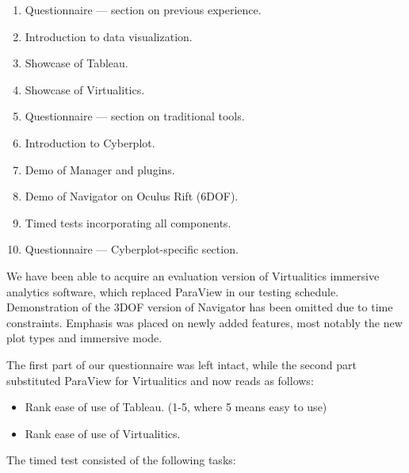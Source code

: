 \documentclass[thesis=M,english,hidelinks]{FITthesisXE}[2012/06/26]
\begin{document}
\begin{enumerate}
\item Questionnaire --- section on previous experience.
\item Introduction to data visualization.
\item Showcase of Tableau.
\item Showcase of Virtualitics.
\item Questionnaire --- section on traditional tools.
\item Introduction to Cyberplot.
\item Demo of Manager and plugins.
\item Demo of Navigator on Oculus Rift (6DOF).
\item Timed tests incorporating all components.
\item Questionnaire --- Cyberplot-specific section.
\end{enumerate}

We have been able to acquire an evaluation version of Virtualitics immersive analytics software, which replaced ParaView in our testing schedule. Demonstration of the 3DOF version of Navigator has been omitted due to time constraints. Emphasis was placed on newly added features, most notably the new plot types and immersive mode.

The first part of our questionnaire was left intact, while the second part substituted ParaView for Virtualitics and now reads as follows:

\begin{itemize}
\item Rank ease of use of Tableau. (1-5, where 5 means easy to use)
\item Rank ease of use of Virtualitics.
\end{itemize}

The timed test consisted of the following tasks:
\end{document}
